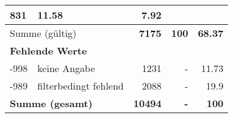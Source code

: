 \begin{longtable}{lXrrr}
       \num{831} &
       \num[round-mode=places,round-precision=2]{11,58} &
         \num[round-mode=places,round-precision=2]{7,92} \\
     \midrule
     \multicolumn{2}{l}{Summe (gültig)} &
       \textbf{\num{7175}} &
     \textbf{100} &
       \textbf{\num[round-mode=places,round-precision=2]{68,37}} \\
     \multicolumn{5}{l}{\textbf{Fehlende Werte}}\\
       -998 &
       keine Angabe &
         \num{1231} &
        - &
         \num[round-mode=places,round-precision=2]{11,73} \\
       -989 &
       filterbedingt fehlend &
         \num{2088} &
        - &
         \num[round-mode=places,round-precision=2]{19,9} \\
     \midrule
     \multicolumn{2}{l}{\textbf{Summe (gesamt)}} &
          \textbf{\num{10494}} &
        \textbf{-} &
        \textbf{100} \\
     \bottomrule
     \end{longtable}
     
